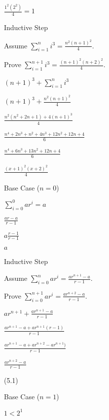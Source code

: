 \documentclass{exam}
\begin{document}
\begin{questions}
\begin{subparts}
\begin{center}
\(\frac{1^2(2^2)}{4} = 1\)
\vspace{5px}

Inductive Step

Assume \( \sum_{i=1}^{n} i^3 = \frac{n^2(n+1)^2}{4} \). 

Prove \(  \sum_{i=1}^{n+1} i^3 = \frac{(n+1)^2(n+2)^2}{4} \).

\( (n+1)^3 + \sum_{i=1}^{n} i^3 \)

\( (n+1)^3 + \frac{n^2(n+1)^2}{4} \)

\(  \frac{n^2(n^2+2n+1) + 4(n+1)^3}{4} \)

\(  \frac{n^4+2n^3+n^2+4n^3+12n^2+12n+4}{6} \)

\(  \frac{n^4+6n^3+13n^2+12n+4}{6} \)

\(  \frac{(x+1)^2(x+2)^2}{4} \)

\end{center}



\begin{center}

Base Case (\(n = 0\))

\(\sum_{i=0}^{0} ar^i = a\)

\(\frac{ar - a}{r-1}\)

\(a\frac{r-1}{r-1}\)

\(a\)
\vspace{5px}

Inductive Step

Assume \( \sum_{i=0}^{n} ar^i = \frac{ar^{n+1} - a}{r-1} \). 

Prove \( \sum_{i=0}^{n+1} ar^i = \frac{ar^{n+2} - a}{r-1} \).

\( ar^{n+1} + \frac{ar^{n+1} - a}{r-1} \)

\( \frac{ar^{n+1} - a + ar^{n+1}(r-1) }{r-1} \)

\( \frac{ar^{n+1} - a + ar^{n+2} -  ar^{n+1}) }{r-1} \)

\( \frac{ar^{n+2} - a }{r-1} \)


\end{center}

\end{subparts}

 (5.1)

\begin{center}
Base Case (\(n = 1\))

\( 1 < 2^1 \)


\end{center}
\end{questions}
\end{document}
